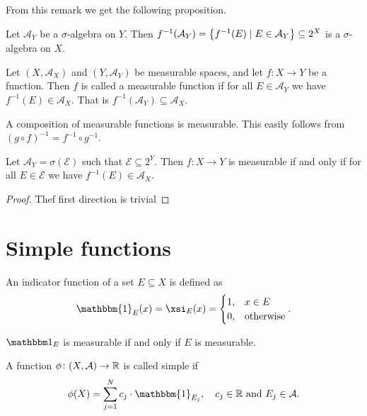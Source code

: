 \documentclass[11pt,a4paper]{article}
\newcommand{\A}{\mathcal A}
\begin{document}
From this remark we get the following proposition.

\begin{proposition}
  Let $\A_Y$ be a $\sigma$-algebra on $Y$.
  Then $f^{-1}(\A_Y) = \set{f^{-1}(E) \mid E \in \A_Y} \subseteq 2^X$
  is a $\sigma$-algebra on $X$.
\end{proposition}

\begin{definition}
  Let $(X, \A_X)$ and $(Y, \A_Y)$ be measurable spaces,
  and let $f \colon X \to Y$ be a function.
  Then $f$ is called a measurable function if for all $E \in \A_Y$ we
  have $f^{-1}(E) \in \A_X$.
  That is $f^{-1}(\A_Y) \subseteq \A_X$.
\end{definition}

\begin{remark}
  A composition of measurable functions is measurable.
  This easily follows from $(g \circ f)^{-1} = f^{-1} \circ g^{-1}$.
\end{remark}

\begin{lemma}
  Let $\A_Y = \sigma(\mathcal E)$ such that $\mathcal E \subseteq 2^{Y}$.
  Then $f \colon X \to Y$ is measurable if and only if for all
  $E \in \mathcal E$ we have $f^{-1}(E) \in \A_X$.
\end{lemma}
\begin{proof}
  Thef first direction is trivial
\end{proof}


\section{Simple functions}
\begin{definition}
  An indicator function of a set $E \subseteq X$ is defined as
  \[
    \mathbbm{1}_E(x) =
    \xsi_E(x) =
    \begin{cases}
      1, &x \in E \\
      0, &\text{otherwise}
    \end{cases}.
  \]
\end{definition}
\begin{remark}
  $\mathbbm 1_E$ is measurable if and only if $E$ is measurable.
\end{remark}

\begin{definition}
  A function $\phi \colon (X,\A) \to \R$ is called simple if
  \[
    \phi(X) = \sum_{j=1}^{N} c_j \cdot \mathbbm{1}_{E_j}, \quad
    c_j \in \R \stand E_j \in \A.
  \]
\end{definition}
\end{document}
